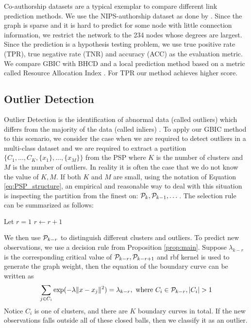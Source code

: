 Co-authorship datasets are a typical exemplar to compare different link prediction methods. We use the NIPS-authorship dataset as done by \cite{RN23}.
Since the graph is sparse and it is hard to predict for some node with little connection information, we restrict the network to the 234 nodes whose degrees are largest. Since the prediction  is a hypothesis testing problem, we use true positive rate (TPR), true negative rate (TNR) and accuracy (ACC) as the evaluation metric. We compare GBIC with BHCD and a local prediction method based on a metric called Resource Allocation Index \citep{zhou2009predicting}. For TPR our method achieves higher score.

\begin{table}
\centering

\end{table}



\subsection{Outlier Detection}\label{subsec:od}
Outlier Detection is the identification of abnormal data (called outliers) which differs from the majority of the data (called inliers) \citep{grubbs1969procedures}.
To apply our GBIC method to this scenario, we consider the case when we are required to detect outliers in a multi-class dataset and we are required to
extract a partition $\{C_1, \dots, C_K, \{x_1\}, \dots, \{x_M\}\}$ from the PSP where $K$ is the number of clusters and $M$ is the number of outliers.
In reality it is often the case that we do not know the value of $K, M$.
If both $K$ and $M$ are small, using the notation of Equation \eqref{eq:PSP_structure}, an empirical and reasonable way to deal with this situation is inspecting the partition from the finest on: $\P_k, \P_{k-1}, \dots$.
The selection rule can be summarized as follows:

\begin{algorithmic}
\STATE Let $r=1$
\STATE $r\leftarrow r+1$
\ENDWHILE
\end{algorithmic}

We then use $\P_{k-r}$ to distinguish different clusters and outliers. To predict new observations,  we use a decision rule from Proposition \ref{prop:main}.
Suppose $\lambda_{k-r}$ is the corresponding critical value of $\P_{k-r}, \P_{k-r+1}$ and rbf kernel is used to generate the graph weight, then the equation of
the boundary curve can be written as
\begin{equation}
\sum_{j \in C_i} \exp(-\lambda \norm{x - x_j}^2)= \lambda_{k-r}, \text{ where } C_i \in \P_{k-r},  \abs{C_i} > 1
\end{equation}
Notice $C_i$ is one of clusters, and there are $K$ boundary curves in total. If the new observations falls outside all of these closed balls, then we classify it as an outlier.

